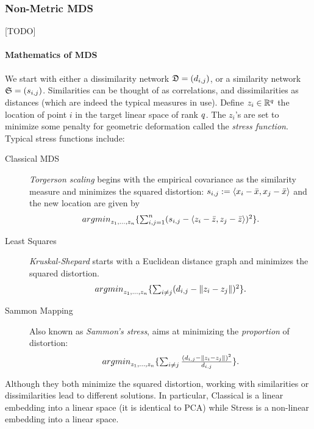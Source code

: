 \documentclass[12pt,a4paper]{article}
\begin{document}
\subsubsection{Non-Metric MDS}
[TODO]


\paragraph{Mathematics of MDS}
We start with either a dissimilarity network $\mathfrak{D}=(d_{i,j})$, or a similarity network $\mathfrak{S}=(s_{i,j})$.
Similarities can be thought of as correlations, and dissimilarities as distances (which are indeed the typical measures in use).
Define $z_i \in \mathbb{R}^q$ the location of point $i$ in the target linear space of rank $q$. 
The $z_i$'s are set to minimize some penalty for geometric deformation called the \emph{stress function}.
Typical stress functions include:
\begin{description}
	
	\item[Classical MDS] \Aka \emph{Torgerson scaling} begins with the empirical covariance as the similarity measure and minimizes the squared distortion:
	$s_{i,j}:= \left< x_i-\bar x,x_j-\bar{x} \right>$ and the new location are given by
	\begin{align}
	\label{eq:mds_classical}
	\textstyle{\mathop{argmin}_{z_1,\dots,z_n}}\{ \sum_{i,j=1}^{n} (s_{i,j}-\left< z_i-\bar z,z_j-\bar{z} \right> )^2 \}.
	\end{align}
	
	\item[Least Squares] \Aka \emph{Kruskal-Shepard} starts with a Euclidean distance graph and minimizes the squared distortion. 
	\begin{align}
	\label{eq:mds_stress}
	\textstyle{\mathop{argmin}_{z_1,\dots,z_n}}\{ \sum_{i \neq j} (d_{i,j}-\Vert z_i-z_j \Vert )^2 \}.
	\end{align}
	
	\item[Sammon Mapping] Also known as \emph{Sammon's stress}, aims at minimizing the \emph{proportion} of distortion:
	\begin{align}
	\label{eq:mds_sammon}
	\textstyle{\mathop{argmin}_{z_1,\dots,z_n}}\{ \sum_{i \neq j} \frac{(d_{i,j}-\Vert z_i-z_j \Vert )^2}{d_{i,j}} \}.
	\end{align}
	
\end{description}


\begin{remark}
	Although they both minimize the squared distortion, working with similarities or dissimilarities lead to different solutions. 
	In particular, Classical is a linear embedding into a linear space (it is identical to PCA) while Stress is a non-linear embedding into a linear space. 
\end{remark}
\end{document}
